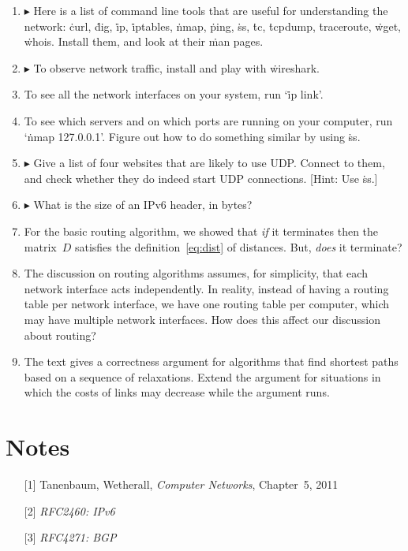 \begin{enumerate}
\item
  $\blacktriangleright$
  Here is a list of command line tools that are useful for understanding the network:
  \.{curl},
  \.{dig},
  \.{ip},
  \.{iptables},
  \.{nmap},
  \.{ping},
  \.{ss},
  \.{tc},
  \.{tcpdump},
  \.{traceroute},
  \.{wget},
  \.{whois}.
  Install them, and look at their \.{man} pages.
\item
  $\blacktriangleright$
  To observe network traffic, install and play with \.{wireshark}.
\item
  To see all the network interfaces on your system,
    run `\.{ip link}'.
\item
  To see which servers and on which ports are running on your computer,
    run `\.{nmap 127.0.0.1}'.
  Figure out how to do something similar by using \.{ss}.
\item
  $\blacktriangleright$
  Give a list of four websites that are likely to use UDP\null.
  Connect to them, and check whether they do indeed start UDP connections.
  [Hint: Use \.{ss}.]
\item
  $\blacktriangleright$
  What is the size of an IPv6 header, in bytes?
\item
  For the basic routing algorithm,
    we showed that
      \emph{if} it terminates
      then the matrix~$D$ satisfies the definition~\eqref{eq:dist} of distances.
  But, \emph{does} it terminate?
\item
  The discussion on routing algorithms assumes, for simplicity,
    that each network interface acts independently.
  In reality,
    instead of having a routing table per network interface,
    we have one routing table per computer,
    which may have multiple network interfaces.
  How does this affect our discussion about routing?
\item
  The text gives a correctness argument for algorithms that find shortest paths
    based on a sequence of relaxations.
  Extend the argument for situations in which the costs of links may decrease
    while the argument runs.
\end{enumerate}

\section{Notes}

\begin{itemize}
\item[{[1]}]
  Tanenbaum, Wetherall,
  \emph{Computer Networks}, Chapter~5,
  2011
\item[{[2]}]
  \emph{RFC2460: IPv6}
\item[{[3]}]
  \emph{RFC4271: BGP}
\end{itemize}




